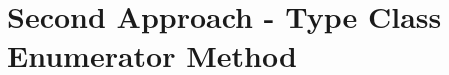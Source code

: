 \documentclass[mathserif]{beamer}
\begin{document}
%
%
%
%
%
%


\section{Second Approach - Type Class Enumerator Method}
\begin{frame}
    \huge

\end{frame}
\end{document}
